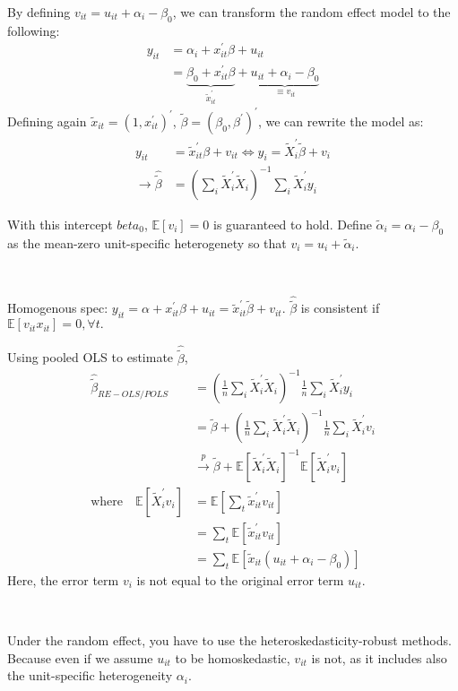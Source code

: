 By defining $v_{it} = u_{it} + \alpha_i - \beta_0$, we can transform the random effect model to the following:
\begin{align*}
    y_{it} &= \alpha_i + x_{it}^{\prime} \beta + u_{it} \\
    &= \underset{\tilde{x}_{it}^{\prime}}{\underbrace{\beta_0 + x_{it}^{\prime}\beta}} + \underset{\equiv v_{it}}{\underbrace{u_{it} + \alpha_i - \beta_0}}
\end{align*}
Defining again $\tilde{x}_{it} = (1, x_{it}^{\prime})^{\prime}$, $\tilde{\beta} = (\beta_0, \beta^{\prime})^{\prime}$, we can rewrite the model as:
\begin{align*}
    y_{it} &= \tilde{x}_{it}^{\prime} \beta + v_{it} \Leftrightarrow y_i = \tilde{X}_i^{\prime} \tilde{\beta} + v_i \\
    \rightarrow \hat{\tilde{\beta}} &= \left(\sum_i \tilde{X}_i^{\prime} \tilde{X}_i \right)^{-1} \sum_i \tilde{X}_i^{\prime} y_i
\end{align*}

With this intercept $beta_0$, $\mathbb{E}[v_i] = 0$ is guaranteed to hold.
Define $\tilde{\alpha}_i = \alpha_i - \beta_0$ as the mean-zero unit-specific heterogenety so that $v_i = u_i + \tilde{\alpha}_i.$


\begin{note}[POLS]
    \

    Homogenous spec: $y_{it} = \alpha  + x_{it}^{\prime} \beta + u_{it} = \tilde{x}_{it}^{\prime} \tilde{\beta} + v_{it}.$
    $\hat{\tilde{\beta}}$ is consistent if $\mathbb{E}[v_{it} x_{it}]=0, \forall t.$
\end{note}
Using pooled OLS to estimate $\hat{\tilde{\beta}}$,
\begin{align*}
    \hat{\tilde{\beta}}_{RE-OLS/POLS} &= \left(\frac{1}{n} \sum_i \tilde{X}_i^{\prime} \tilde{X}_i \right)^{-1} \frac{1}{n} \sum_i \tilde{X}_i^{\prime} y_i \\
    &= \tilde{\beta} + \left(\frac{1}{n} \sum_i \tilde{X}_i^{\prime} \tilde{X}_i \right)^{-1} \frac{1}{n} \sum_i \tilde{X}_i^{\prime} v_i \\
    &\overset{p}{\rightarrow} \tilde{\beta} + \mathbb{E}[\tilde{X}_i^{\prime} \tilde{X}_i]^{-1} \mathbb{E}[\tilde{X}_i^{\prime} v_i] \\
    \text{where} \quad \mathbb{E}[\tilde{X}_i^{\prime} v_i] &= \mathbb{E}\left[\sum_t \tilde{x}_{it}^{\prime} v_{it} \right] \\
    &= \sum_t \mathbb{E}\left[\tilde{x}_{it}^{\prime} v_{it}  \right] \\
    &= \sum_t \mathbb{E}\left[\tilde{x}_{it}(u_{it} + \alpha_i - \beta_0)\right]
\end{align*}
Here, the error term $v_i$ is not equal to the original error term $u_{it}$.
\begin{note}
    \

    Under the random effect, you have to use the heteroskedasticity-robust methods.
    Because even if we assume $u_{it}$ to be homoskedastic, $v_{it}$ is not,
    as it includes also the unit-speciﬁc heterogeneity $\alpha_i$.
\end{note}

